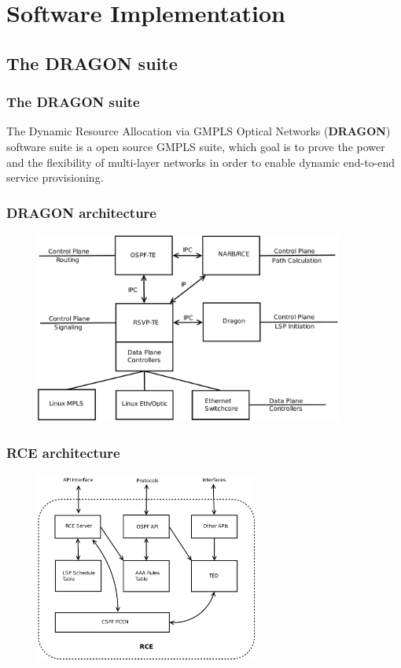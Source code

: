 \documentclass{beamer}
\begin{document}
\section{Software Implementation}
\subsection{The DRAGON suite}
\frame 
{ 
  \frametitle{The DRAGON suite}

  The Dynamic Resource Allocation via GMPLS Optical Networks
  (\textbf{DRAGON}) software suite is a open source GMPLS suite, which
  goal is to prove the power and the flexibility of multi-layer
  networks in order to enable dynamic end-to-end service provisioning.

}
\frame
{
  \frametitle{DRAGON architecture}

  \begin{figure}[!htbp]
    \begin{center}
      \includegraphics[width=0.9\textwidth]{img/dragon_model}
      \label{fig:dragon_model}
    \end{center}
  \end{figure}
}
\frame
{
  \frametitle{RCE architecture}

  \begin{figure}[!htbp]
    \begin{center}
      \includegraphics[width=0.65\textwidth]{img/rce_model}
    \end{center}
  \end{figure}
}
\end{document}
